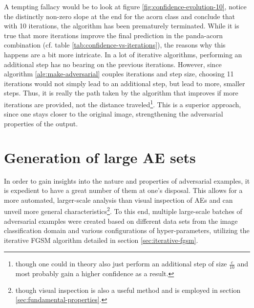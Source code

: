 \documentclass[11pt, a4paper]{article}
\begin{document}
A tempting fallacy would be to look at figure \ref{fig:confidence-evolution-10}, notice the distinctly non-zero slope at the end for the acorn class and conclude that with 10 iterations, the algorithm has been prematurely terminated. While it is true that more iterations improve the final prediction in the panda-acorn combination (cf. table \ref{tab:confidence-vs-iterations}), the reasons why this happens are a bit more intricate. In a lot of iterative algorithms, performing an additional step has no bearing on the previous iterations. However, since algorithm \ref{alg:make-adversarial} couples iterations and step size, choosing 11 iterations would not simply lead to an additional step, but lead to more, smaller steps. Thus, it is really the path taken by the algorithm that improves if more iterations are provided, not the distance traveled\footnote{though one could in theory also just perform an additional step of size $\frac{c}{10}$ and most probably gain a higher confidence as a result.}. This is a superior approach, since one stays closer to the original image, strengthening the adversarial properties of the output.









\section{Generation of large AE sets}
\label{sec:generation-large-sets}

In order to gain insights into the nature and properties of adversarial examples, it is expedient to have a great number of them at one's disposal. This allows for a more automated, larger-scale analysis than visual inspection of AEs and can unveil more general characteristics\footnote{though visual inspection is also a useful method and is employed in section \ref{sec:fundamental-properties}.}. To this end, multiple large-scale batches of adversarial examples were created based on different data sets from the image classification domain and various configurations of hyper-parameters, utilizing the iterative FGSM algorithm detailed in section \ref{sec:iterative-fgsm}. 
\end{document}
